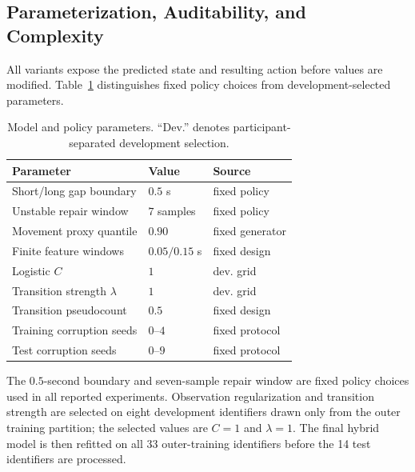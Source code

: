 \documentclass[sigconf,review]{acmart}
\begin{document}
\subsection{Parameterization, Auditability, and Complexity}
All variants expose the predicted state and resulting action before values are modified. Table~\ref{tab:model_parameters} distinguishes fixed policy choices from development-selected parameters.
\begin{table}[h]
\centering
\caption{Model and policy parameters. ``Dev.'' denotes participant-separated development selection.}
\label{tab:model_parameters}
\small
\begin{tabular}{lll}
\toprule
Parameter & Value & Source \\
\midrule
Short/long gap boundary & $0.5$ s & fixed policy \\
Unstable repair window & $7$ samples & fixed policy \\
Movement proxy quantile & $0.90$ & fixed generator \\
Finite feature windows & $0.05/0.15$ s & fixed design \\
Logistic $C$ & $1$ & dev. grid \\
Transition strength $\lambda$ & $1$ & dev. grid \\
Transition pseudocount & $0.5$ & fixed design \\
Training corruption seeds & $0$--$4$ & fixed protocol \\
Test corruption seeds & $0$--$9$ & fixed protocol \\
\bottomrule
\end{tabular}
\end{table}
 The $0.5$-second boundary and seven-sample repair window are fixed policy choices used in all reported experiments. Observation regularization and transition strength are selected on eight development identifiers drawn only from the outer training partition; the selected values are $C=1$ and $\lambda=1$. The final hybrid model is then refitted on all 33 outer-training identifiers before the 14 test identifiers are processed.
\end{document}
